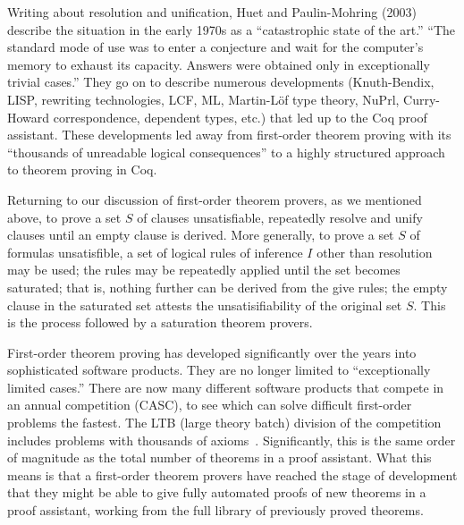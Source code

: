 \documentclass{llncs}
\begin{document}
Writing about resolution and unification, Huet and Paulin-Mohring
(2003) \cite{Coq} describe the situation in the early 1970s as a
``catastrophic state of the art.''  ``The standard mode of use was to
enter a conjecture and wait for the computer's memory to exhaust its
capacity.  Answers were obtained only in exceptionally trivial
cases.'' %
They go on to describe numerous developments (Knuth-Bendix, LISP,
rewriting technologies, LCF, ML, Martin-L\"of type theory, NuPrl,
Curry-Howard correspondence, dependent types, etc.) that led up to the
Coq proof assistant.  These developments led away from first-order
theorem proving with its ``thousands of unreadable logical
consequences'' to a highly structured approach to theorem proving in Coq.


Returning to our discussion of first-order theorem provers,
as we mentioned above, to prove a set $S$ of clauses
unsatisfiable, repeatedly resolve and unify clauses until an empty
clause is derived.  More generally, to prove a set $S$ of formulas
unsatisfible, a set of logical rules of inference $I$ other than
resolution may be used; the rules may be repeatedly applied until the
set becomes saturated; that is, nothing further can be derived from
the give rules; the empty clause in the saturated set attests
the unsatisifiability of the original set $S$. 
This is the process followed by a saturation theorem provers.


First-order theorem proving has developed significantly over the years
into sophisticated software products.  They are no longer limited to
``exceptionally limited cases.''  There are now many different
software products that compete in an annual competition (CASC), to see
which can solve difficult first-order problems the fastest.  The LTB
(large theory batch) division of the competition includes problems
with thousands of axioms~\cite{PSST}.  Significantly, this is the same order of
magnitude as the total number of theorems in a proof assistant.  What
this means is that a first-order theorem provers have reached the
stage of development that they might be able to give fully automated
proofs of new theorems in a proof assistant, working from the full
library of previously proved theorems.
\end{document}
